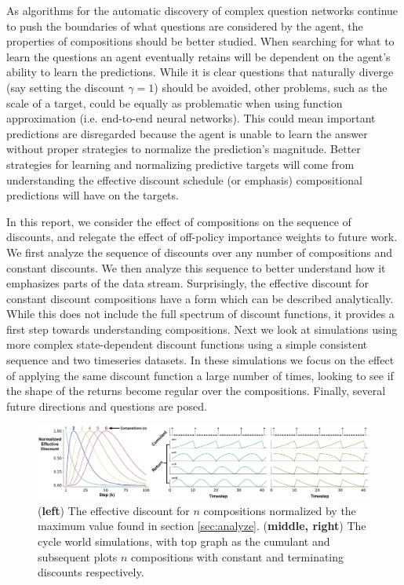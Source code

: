 \documentclass[11pt]{article} %
\begin{document}
As algorithms for the automatic discovery of complex question networks
continue to push the boundaries of what questions are considered by
the agent, the properties of compositions should be better studied.
When searching for what to learn the questions an agent eventually
retains will be dependent on the agent's ability to learn the
predictions.
While it is clear
questions that naturally diverge (say setting the discount
$\gamma=1$) should be avoided, other problems, such
as the scale of a target, could be equally as problematic when using
function approximation (i.e. end-to-end neural networks). This
could mean important predictions are disregarded because the agent is
unable to learn the answer without proper strategies to normalize the
prediction's magnitude. Better strategies for learning and normalizing
predictive targets will come from understanding the effective discount
schedule (or emphasis) compositional predictions will have on the
targets.

In this report, we consider the effect of compositions on the sequence
of discounts, and relegate the effect of off-policy importance weights
to future work.
We first analyze the sequence of discounts over any
number of compositions and constant discounts. We then analyze
this sequence to better
understand how it emphasizes parts of the data stream.
Surprisingly, the effective discount for constant discount compositions
have a form which can be described analytically. While this does
not include the full spectrum of discount functions, it provides a
first step towards understanding compositions.
Next we look at simulations using more complex state-dependent
discount functions using a simple consistent sequence and two
timeseries datasets. In these simulations we focus on the effect of
applying the same discount function a large number of times, looking
to see if the shape of the returns become regular over the
compositions. Finally, several future directions and questions are posed.
%
%
\begin{figure}
  \centering
  \includegraphics[width=\textwidth]{plots/seq_plus_cw.pdf}
  \caption{(\textbf{left}) The effective discount for $n$ compositions
    normalized by the maximum value found in section
    \ref{sec:analyze}. (\textbf{middle, right}) The cycle world
    simulations, with top graph as the cumulant and subsequent plots
    $n$ compositions with constant and terminating discounts
    respectively. \vspace{-0.3cm}} \label{fig:seq_cw}
\end{figure}
%
%
\end{document}
